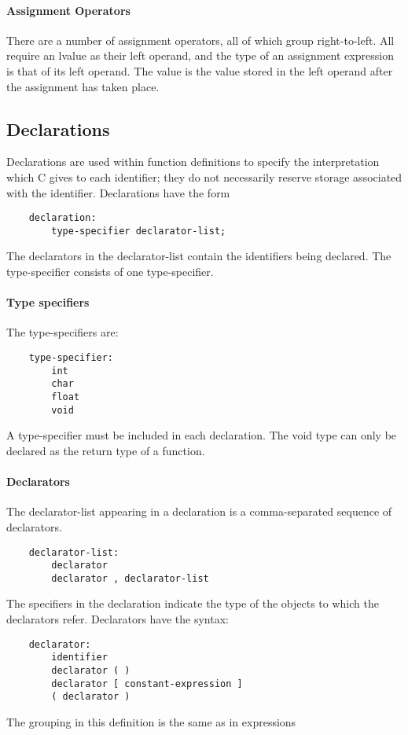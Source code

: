 \documentclass[a4paper]{article}
\begin{document}
\paragraph{Assignment Operators}
There are a number of assignment operators, all of which group right-to-left. All require an lvalue as their left operand, and the type of an assignment expression is that of its left operand. The value is the value stored in the left operand after the assignment has taken place.

\subsection{Declarations}
Declarations are used within function definitions to specify the interpretation which C gives to each identifier; they do not necessarily reserve storage associated with the identifier. Declarations have the form
\begin{verbatim}
    declaration:
        type-specifier declarator-list;
\end{verbatim}
The declarators in the declarator-list contain the identifiers being declared. The type-specifier consists of one type-specifier.

\paragraph{Type specifiers}
The type-specifiers are:
\begin{verbatim}
    type-specifier:
        int
        char
        float
        void
\end{verbatim}
A type-specifier must be included in each declaration. The void type can only be declared as the return type of a function.

\paragraph{Declarators}
The declarator-list appearing in a declaration is a comma-separated sequence of declarators.
\begin{verbatim}
    declarator-list:
        declarator
        declarator , declarator-list
\end{verbatim}
The specifiers in the declaration indicate the type of the objects to which the declarators refer. Declarators have the syntax:
\begin{verbatim}
    declarator:
        identifier
        declarator ( )
        declarator [ constant-expression ]
        ( declarator )
\end{verbatim}
The grouping in this definition is the same as in expressions
\end{document}
